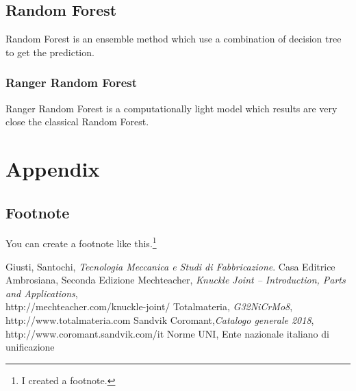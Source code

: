 \documentclass{FR16}
\begin{document}
\subsection{Random Forest}
Random Forest is an ensemble method which use a combination of decision tree to get the prediction.
\subsubsection{Ranger Random Forest}
Ranger Random Forest is a computationally light model which results are very close the classical Random Forest.
\\





\newpage
\section{Appendix}
%

\newpage


\subsection{Footnote}
You can create a footnote like this.\footnote{I created a footnote.}



\newpage
\begin{thebibliography}{9}
Giusti, Santochi, \emph{Tecnologia Meccanica e Studi di Fabbricazione}. Casa Editrice Ambrosiana, Seconda Edizione
Mechteacher, \emph{Knuckle Joint – Introduction, Parts and Applications},\\ http://mechteacher.com/knuckle-joint/
Totalmateria, \emph{G32NiCrMo8}, http://www.totalmateria.com 
Sandvik Coromant,\emph{Catalogo  generale  2018},   http://www.coromant.sandvik.com/it
Norme UNI, Ente nazionale italiano di unificazione
\end{thebibliography}
\end{document}
